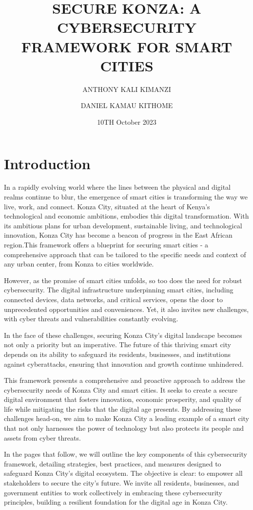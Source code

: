 \documentclass{article}
\title{SECURE KONZA: A CYBERSECURITY FRAMEWORK FOR SMART CITIES }
\author[1]{ANTHONY KALI KIMANZI}
\author[2]{DANIEL KAMAU KITHOME}
\date{10TH October 2023}
\affil[1]{SOFTWARE ENGINEER AND CYBERSECURITY PROFESSIONAL}
\affil[2]{RESEARCHER AND  CYBERSECURITY PROFESSIONAL}
\begin{document}
\maketitle

\section*{Introduction}
In a rapidly evolving world where the lines between the physical and digital realms continue to blur, the emergence of smart cities is transforming the way we live, work, and connect. Konza City, situated at the heart of Kenya's technological and economic ambitions, embodies this digital transformation. With its ambitious plans for urban development, sustainable living, and technological innovation, Konza City has become a beacon of progress in the East African region.This framework offers a blueprint for securing smart cities - a comprehensive approach that can be tailored to the specific needs and context of any urban center, from Konza to cities worldwide.

However, as the promise of smart cities unfolds, so too does the need for robust cybersecurity. The digital infrastructure underpinning smart cities, including connected devices, data networks, and critical services, opens the door to unprecedented opportunities and conveniences. Yet, it also invites new challenges, with cyber threats and vulnerabilities constantly evolving.

In the face of these challenges, securing Konza City's digital landscape becomes not only a priority but an imperative. The future of this thriving smart city depends on its ability to safeguard its residents, businesses, and institutions against cyberattacks, ensuring that innovation and growth continue unhindered.

This framework presents a comprehensive and proactive approach to address the cybersecurity needs of Konza City and smart cities. It seeks to create a secure digital environment that fosters innovation, economic prosperity, and quality of life while mitigating the risks that the digital age presents. By addressing these challenges head-on, we aim to make Konza City a leading example of a smart city that not only harnesses the power of technology but also protects its people and assets from cyber threats.

In the pages that follow, we will outline the key components of this cybersecurity framework, detailing strategies, best practices, and measures designed to safeguard Konza City's digital ecosystem. The objective is clear: to empower all stakeholders to secure the city's future. We invite all residents, businesses, and government entities to work collectively in embracing these cybersecurity principles, building a resilient foundation for the digital age in Konza City.
\end{document}
